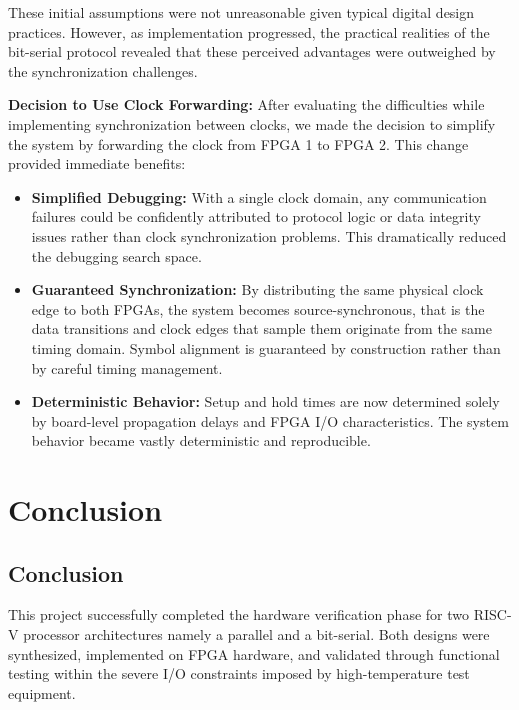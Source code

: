 \documentclass[12pt]{article}
\begin{document}
These initial assumptions were not unreasonable given typical digital design practices. However, as implementation progressed, the practical realities of the bit-serial protocol revealed that these perceived advantages were outweighed by the synchronization challenges.

\textbf{Decision to Use Clock Forwarding:} After evaluating the difficulties while implementing synchronization between clocks, we made the decision to simplify the system by forwarding the clock from FPGA 1 to FPGA 2. This change provided immediate benefits:

\begin{itemize}
    \item \textbf{Simplified Debugging:} With a single clock domain, any communication failures could be confidently attributed to protocol logic or data integrity issues rather than clock synchronization problems. This dramatically reduced the debugging search space.
    
    \item \textbf{Guaranteed Synchronization:} By distributing the same physical clock edge to both FPGAs, the system becomes source-synchronous, that is the data transitions and clock edges that sample them originate from the same timing domain. Symbol alignment is guaranteed by construction rather than by careful timing management.
    
    \item \textbf{Deterministic Behavior:} Setup and hold times are now determined solely by board-level propagation delays and FPGA I/O characteristics. The system behavior became vastly deterministic and reproducible.
\end{itemize}
\section{Conclusion}

\subsection{Conclusion}
This project successfully completed the hardware verification phase for two RISC-V processor architectures namely a parallel and a bit-serial. Both designs were synthesized, implemented on FPGA hardware, and validated through functional testing within the severe I/O constraints imposed by high-temperature test equipment.
\end{document}
